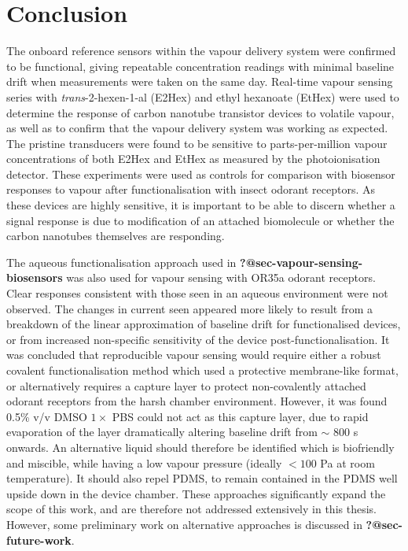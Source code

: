 \documentclass[
  a4paper,
]{scrbook}
\begin{document}
\hypertarget{conclusion}{%
\section{Conclusion}\label{conclusion}}

The onboard reference sensors within the vapour delivery system were
confirmed to be functional, giving repeatable concentration readings
with minimal baseline drift when measurements were taken on the same
day. Real-time vapour sensing series with \emph{trans}-2-hexen-1-al
(E2Hex) and ethyl hexanoate (EtHex) were used to determine the response
of carbon nanotube transistor devices to volatile vapour, as well as to
confirm that the vapour delivery system was working as expected. The
pristine transducers were found to be sensitive to parts-per-million
vapour concentrations of both E2Hex and EtHex as measured by the
photoionisation detector. These experiments were used as controls for
comparison with biosensor responses to vapour after functionalisation
with insect odorant receptors. As these devices are highly sensitive, it
is important to be able to discern whether a signal response is due to
modification of an attached biomolecule or whether the carbon nanotubes
themselves are responding.

The aqueous functionalisation approach used in
\textbf{?@sec-vapour-sensing-biosensors} was also used for vapour
sensing with OR35a odorant receptors. Clear responses consistent with
those seen in an aqueous environment were not observed. The changes in
current seen appeared more likely to result from a breakdown of the
linear approximation of baseline drift for functionalised devices, or
from increased non-specific sensitivity of the device
post-functionalisation. It was concluded that reproducible vapour
sensing would require either a robust covalent functionalisation method
which used a protective membrane-like format, or alternatively requires
a capture layer to protect non-covalently attached odorant receptors
from the harsh chamber environment. However, it was found 0.5\% v/v DMSO
\(1 \times\) PBS could not act as this capture layer, due to rapid
evaporation of the layer dramatically altering baseline drift from
\(\sim\) 800 s onwards. An alternative liquid should therefore be
identified which is biofriendly and miscible, while having a low vapour
pressure (ideally \(< 100\) Pa at room temperature). It should also
repel PDMS, to remain contained in the PDMS well upside down in the
device chamber. These approaches significantly expand the scope of this
work, and are therefore not addressed extensively in this thesis.
However, some preliminary work on alternative approaches is discussed in
\textbf{?@sec-future-work}.
\end{document}
